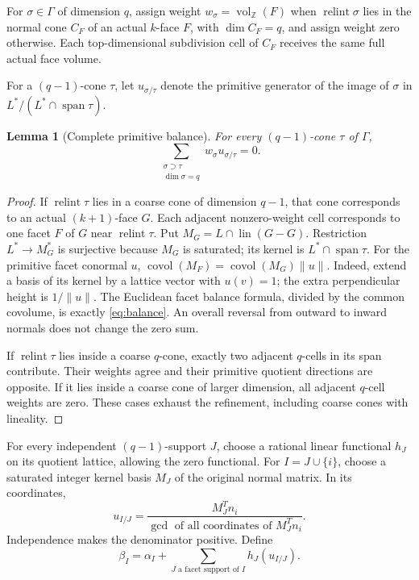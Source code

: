 \documentclass[11pt]{article}
\newtheorem{lemma}[theorem]{Lemma}
\theoremstyle{definition}\newtheorem{definition}[theorem]{Definition}
\theoremstyle{remark}\newtheorem{remark}[theorem]{Remark}
\newcommand{\Z}{\mathbb Z}\newcommand{\Q}{\mathbb Q}\newcommand{\R}{\mathbb R}
\newcommand{\vol}{\operatorname{vol}_{\Z}}
\newcommand{\relint}{\operatorname{relint}}\newcommand{\cl}{\operatorname{cl}}
\begin{document}
For \(\sigma\in\Gamma\) of dimension \(q\), assign weight
\(w_\sigma=\vol(F)\) when \(\relint\sigma\) lies in the normal cone
\(C_F\) of an actual \(k\)-face \(F\), with \(\dim C_F=q\), and
assign weight zero otherwise. Each top-dimensional subdivision cell of
\(C_F\) receives the same full actual face volume.

For a \((q-1)\)-cone \(\tau\), let \(u_{\sigma/\tau}\) denote the
primitive generator of the image of \(\sigma\) in
\(L^*/(L^*\cap\operatorname{span}\tau)\).
\begin{lemma}[Complete primitive balance]\label{lem:balance}
For every \((q-1)\)-cone \(\tau\) of \(\Gamma\),
\begin{equation}\label{eq:balance}
 \sum_{\substack{\sigma\supset\tau\\\dim\sigma=q}}
 w_\sigma u_{\sigma/\tau}=0.
\end{equation}
\end{lemma}
\begin{proof}
If \(\relint\tau\) lies in a coarse cone of dimension \(q-1\), that
cone corresponds to an actual \((k+1)\)-face \(G\). Each adjacent
nonzero-weight cell corresponds to one facet \(F\) of \(G\) near
\(\relint\tau\). Put \(M_G=L\cap\operatorname{lin}(G-G)\).
Restriction \(L^*\to M_G^*\) is surjective because \(M_G\) is saturated;
its kernel is \(L^*\cap\operatorname{span}\tau\). For the primitive
facet conormal \(u\),
\(\operatorname{covol}(M_F)=\operatorname{covol}(M_G)\|u\|\).
Indeed, extend a basis of its kernel by a lattice vector with \(u(v)=1\);
the extra perpendicular height is \(1/\|u\|\). The Euclidean facet
balance formula, divided by the common covolume, is exactly
\eqref{eq:balance}. An overall reversal from outward to inward normals
does not change the zero sum.

If \(\relint\tau\) lies inside a coarse \(q\)-cone, exactly two adjacent
\(q\)-cells in its span contribute. Their weights agree and their primitive
quotient directions are opposite. If it lies inside a coarse cone of larger
dimension, all adjacent \(q\)-cell weights are zero. These cases exhaust
the refinement, including coarse cones with lineality.
\end{proof}

For every independent \((q-1)\)-support \(J\), choose a rational linear
functional \(h_J\) on its quotient lattice, allowing the zero functional.
For \(I=J\cup\{i\}\), choose a saturated integer kernel basis \(M_J\)
of the original normal matrix. In its coordinates,
\begin{equation}\label{eq:primitive}
 u_{I/J}=\frac{M_J^T n_i}{\gcd\text{ of all coordinates of }M_J^T n_i}.
\end{equation}
Independence makes the denominator positive. Define
\begin{equation}\label{eq:beta}
 \beta_I=\alpha_I+\sum_{J\text{ a facet support of }I}h_J(u_{I/J}).
\end{equation}
\end{document}
